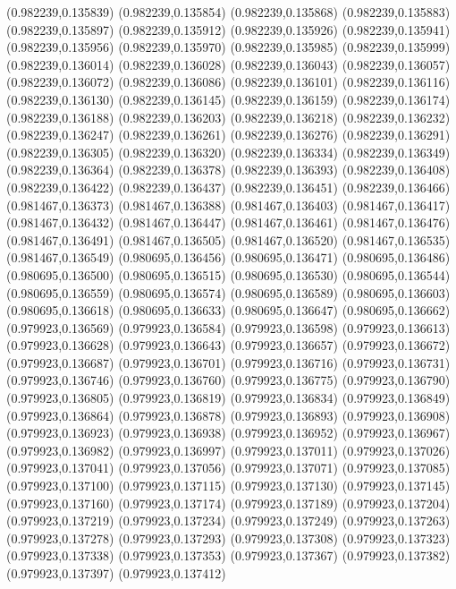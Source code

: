 (0.982239,0.135839)
(0.982239,0.135854)
(0.982239,0.135868)
(0.982239,0.135883)
(0.982239,0.135897)
(0.982239,0.135912)
(0.982239,0.135926)
(0.982239,0.135941)
(0.982239,0.135956)
(0.982239,0.135970)
(0.982239,0.135985)
(0.982239,0.135999)
(0.982239,0.136014)
(0.982239,0.136028)
(0.982239,0.136043)
(0.982239,0.136057)
(0.982239,0.136072)
(0.982239,0.136086)
(0.982239,0.136101)
(0.982239,0.136116)
(0.982239,0.136130)
(0.982239,0.136145)
(0.982239,0.136159)
(0.982239,0.136174)
(0.982239,0.136188)
(0.982239,0.136203)
(0.982239,0.136218)
(0.982239,0.136232)
(0.982239,0.136247)
(0.982239,0.136261)
(0.982239,0.136276)
(0.982239,0.136291)
(0.982239,0.136305)
(0.982239,0.136320)
(0.982239,0.136334)
(0.982239,0.136349)
(0.982239,0.136364)
(0.982239,0.136378)
(0.982239,0.136393)
(0.982239,0.136408)
(0.982239,0.136422)
(0.982239,0.136437)
(0.982239,0.136451)
(0.982239,0.136466)
(0.981467,0.136373)
(0.981467,0.136388)
(0.981467,0.136403)
(0.981467,0.136417)
(0.981467,0.136432)
(0.981467,0.136447)
(0.981467,0.136461)
(0.981467,0.136476)
(0.981467,0.136491)
(0.981467,0.136505)
(0.981467,0.136520)
(0.981467,0.136535)
(0.981467,0.136549)
(0.980695,0.136456)
(0.980695,0.136471)
(0.980695,0.136486)
(0.980695,0.136500)
(0.980695,0.136515)
(0.980695,0.136530)
(0.980695,0.136544)
(0.980695,0.136559)
(0.980695,0.136574)
(0.980695,0.136589)
(0.980695,0.136603)
(0.980695,0.136618)
(0.980695,0.136633)
(0.980695,0.136647)
(0.980695,0.136662)
(0.979923,0.136569)
(0.979923,0.136584)
(0.979923,0.136598)
(0.979923,0.136613)
(0.979923,0.136628)
(0.979923,0.136643)
(0.979923,0.136657)
(0.979923,0.136672)
(0.979923,0.136687)
(0.979923,0.136701)
(0.979923,0.136716)
(0.979923,0.136731)
(0.979923,0.136746)
(0.979923,0.136760)
(0.979923,0.136775)
(0.979923,0.136790)
(0.979923,0.136805)
(0.979923,0.136819)
(0.979923,0.136834)
(0.979923,0.136849)
(0.979923,0.136864)
(0.979923,0.136878)
(0.979923,0.136893)
(0.979923,0.136908)
(0.979923,0.136923)
(0.979923,0.136938)
(0.979923,0.136952)
(0.979923,0.136967)
(0.979923,0.136982)
(0.979923,0.136997)
(0.979923,0.137011)
(0.979923,0.137026)
(0.979923,0.137041)
(0.979923,0.137056)
(0.979923,0.137071)
(0.979923,0.137085)
(0.979923,0.137100)
(0.979923,0.137115)
(0.979923,0.137130)
(0.979923,0.137145)
(0.979923,0.137160)
(0.979923,0.137174)
(0.979923,0.137189)
(0.979923,0.137204)
(0.979923,0.137219)
(0.979923,0.137234)
(0.979923,0.137249)
(0.979923,0.137263)
(0.979923,0.137278)
(0.979923,0.137293)
(0.979923,0.137308)
(0.979923,0.137323)
(0.979923,0.137338)
(0.979923,0.137353)
(0.979923,0.137367)
(0.979923,0.137382)
(0.979923,0.137397)
(0.979923,0.137412)
